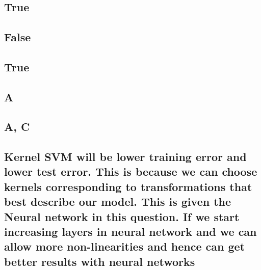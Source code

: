 \documentclass[fleqn]{article}
\begin{document}
	\section{}
	\begin{adjustwidth}{4em}{0pt}
		\subsection{True}
		\subsection{False}
		\subsection{True}
		\subsection{A}
		\subsection{A, C}
		\subsection{Kernel SVM will be lower training error and lower test error. This is because we can choose kernels corresponding to transformations that best describe our model. This is given the Neural network in this question. If we start increasing layers in neural network and we can allow more non-linearities and hence can get better results with neural networks}
	\end{adjustwidth}
	
\end{document}
